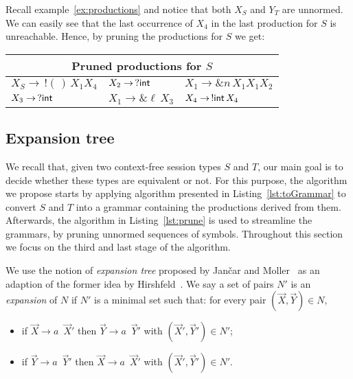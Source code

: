 \begin{example}
  \label{ex:prune}
  Recall example~\ref{ex:productions} and notice that both
  $X_S$ and
  $Y_T$ are unnormed. We can easily see that the last occurrence of
  $X_4$ in the last production for
  $S$ is unreachable. Hence, by pruning the productions for
  $S$ we get:
  \begin{center}
    \begin{tabular}{l l l}
      \multicolumn{3}{c}{Pruned productions for $S$}\\ \hline
      $X_S \rightarrow \,! (\,)\,X_1 X_4$ &
      $X_2 \rightarrow \,? \mathsf{int}$ &
      $X_1 \rightarrow \& n\, X_1 X_1 X_2$
      \\
      $X_3 \rightarrow \,? \mathsf{int}$ &
      $X_1 \rightarrow \& \ell\, X_3$ &
      $X_4 \rightarrow \,!\mathsf{int}\, X_4$
    \end{tabular}
  \end{center}
\end{example}

\subsection{Expansion tree}
\label{subsec:expand}

We recall that, given two context-free session types $S$ and $T$, our main goal
is to decide whether these types are equivalent or not. For this purpose,
the algorithm we propose starts by applying algorithm presented in
Listing~\ref{lst:toGrammar} to convert $S$ and $T$ into a grammar containing
the productions derived from them. Afterwards, the algorithm in
Listing~\ref{lst:prune} is used to streamline the grammars, by pruning
unnormed sequences of symbols. Throughout this section we focus on the
third and last stage of the algorithm.

We use the notion of \emph{expansion tree} proposed by Jan{\v{c}}ar
and Moller~\cite{janvcar1999techniques} as an adaption of the former idea by
Hirshfeld~\cite{hirshfeld1996bisimulation}. We say a set of pairs $N'$ is an
\emph{expansion} of $N$ if $N'$ is a minimal set such that: for every pair
$(\vec X, \vec Y) \in N$,
\begin{itemize}
	\item if $\vec X \rightarrow a \enspace\vec X'$ then $\vec Y \rightarrow
		  a \enspace\vec Y'$ with $(\vec X',\vec Y')\in N'$;
	\item if $\vec Y \rightarrow a \enspace\vec Y'$ then $\vec X \rightarrow
	      a \enspace\vec X'$ with $(\vec X',\vec Y')\in N'$.
\end{itemize}

